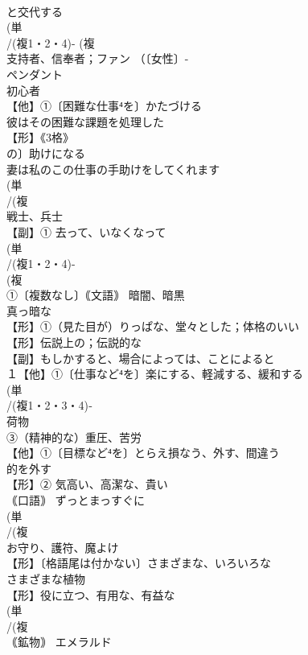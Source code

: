 \documentclass[8pt]{extreport}
\begin{document}
\begin{CJK}{UTF8}{min}
\\	と交代する
\\	(単
\\	/(複1・2・4)- (複
\\	支持者、信奉者；ファン （〔女性〕-
\\	ペンダント 
\\	初心者
\\	【他】①〔困難な仕事⁴を〕かたづける 
\\	彼はその困難な課題を処理した 
\\	【形】《3格》
\\	の〕助けになる 
\\	妻は私のこの仕事の手助けをしてくれます
\\	(単
\\	/(複
\\	戦士、兵士 
\\	【副】① 去って、いなくなって 
\\	(単
\\	/(複1・2・4)-
\\	(複
\\	①〔複数なし〕｟文語｠ 暗闇、暗黒 
\\	真っ暗な
\\	【形】①（見た目が）りっぱな、堂々とした；体格のいい 
\\	【形】伝説上の；伝説的な 
\\	【副】もしかすると、場合によっては、ことによると 
\\	１【他】①〔仕事など⁴を〕楽にする、軽減する、緩和する
\\	(単
\\	/(複1・2・3・4)‐
\\	荷物 
\\	③（精神的な）重圧、苦労 
\\	【他】①〔目標など⁴を〕とらえ損なう、外す、間違う 
\\	的を外す
\\	【形】② 気高い、高潔な、貴い
\\	｟口語｠ ずっとまっすぐに
\\	(単
\\	/(複
\\	お守り、護符、魔よけ 
\\	【形】〔格語尾は付かない〕さまざまな、いろいろな 
\\	さまざまな植物 
\\	【形】役に立つ、有用な、有益な 
\\	(単
\\	/(複
\\	｟鉱物｠ エメラルド 

\end{CJK}
\end{document}

